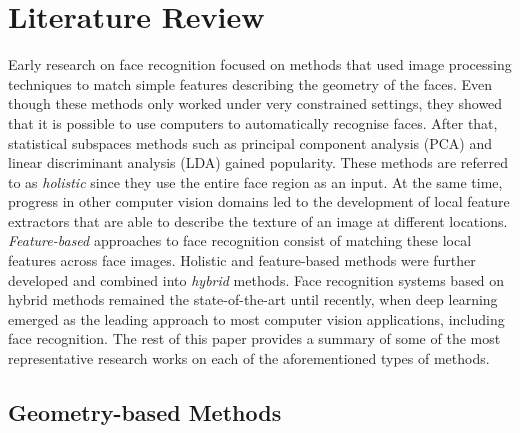 \documentclass[conference]{IEEEtran}
\begin{document}
\section{Literature Review}
\label{sec:literature_review}

Early research on face recognition focused on methods that used image processing techniques to match simple features describing the geometry of the faces. Even though these methods only worked under very constrained settings, they showed that it is possible to use computers to automatically recognise faces. After that, statistical subspaces methods such as principal component analysis (PCA) and linear discriminant analysis (LDA) gained popularity. These methods are referred to as \textit{holistic} since they use the entire face region as an input. At the same time, progress in other computer vision domains led to the development of local feature extractors that are able to describe the texture of an image at different locations. \textit{Feature-based} approaches to face recognition consist of matching these local features across face images. Holistic and feature-based methods were further developed and combined into \textit{hybrid} methods. Face recognition systems based on hybrid methods remained the state-of-the-art until recently, when deep learning emerged as the leading approach to most computer vision applications, including face recognition. The rest of this paper provides a summary of some of the most representative research works on each of the aforementioned types of methods.

\subsection{Geometry-based Methods}
\label{geometry-based_methods}
\end{document}
